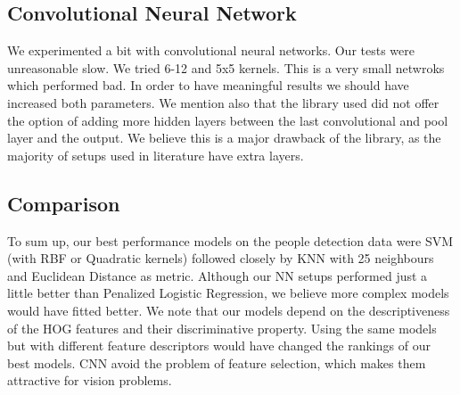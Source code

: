 \subsection{Convolutional Neural Network}
We experimented a bit with convolutional neural networks. Our tests were unreasonable slow. We tried 6-12 and 5x5 kernels. This is a  very small netwroks which performed bad. In order to have meaningful results we should have increased both parameters. We mention also that the library used did not offer the option of adding more hidden layers between the last convolutional and pool layer and the output. We believe this is a major drawback of the library, as the majority of setups used in literature have extra layers.

\subsection{Comparison}
To sum up, our best performance models on the people detection data were SVM (with RBF or Quadratic kernels) followed closely by KNN with 25 neighbours and Euclidean Distance as metric. Although our NN setups performed just a little better than Penalized Logistic Regression, we believe more complex models would have fitted better. 
We note that our models depend on the descriptiveness of the HOG features and their discriminative property. Using the same models but with different feature descriptors would have changed the rankings of our best models. CNN avoid the problem of feature selection, which makes them attractive for vision problems. 
